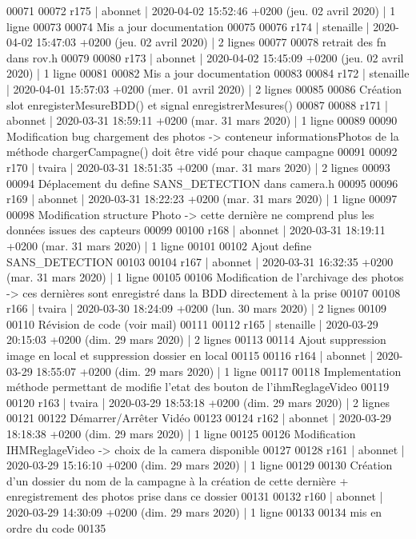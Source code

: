 \begin{DoxyCode}
00071 
00072 r175 | abonnet | 2020-04-02 15:52:46 +0200 (jeu. 02 avril 2020) | 1 ligne
00073 
00074 Mis a jour documentation
00075 
00076 r174 | stenaille | 2020-04-02 15:47:03 +0200 (jeu. 02 avril 2020) | 2 lignes
00077 
00078 retrait des fn dans rov.h
00079 
00080 r173 | abonnet | 2020-04-02 15:45:09 +0200 (jeu. 02 avril 2020) | 1 ligne
00081 
00082 Mis a jour documentation
00083 
00084 r172 | stenaille | 2020-04-01 15:57:03 +0200 (mer. 01 avril 2020) | 2 lignes
00085 
00086 Création slot enregisterMesureBDD() et signal enregistrerMesures()
00087 
00088 r171 | abonnet | 2020-03-31 18:59:11 +0200 (mar. 31 mars 2020) | 1 ligne
00089 
00090 Modification bug chargement des photos -> conteneur informationsPhotos de la méthode chargerCampagne()
       doit être vidé pour chaque campagne
00091 
00092 r170 | tvaira | 2020-03-31 18:51:35 +0200 (mar. 31 mars 2020) | 2 lignes
00093 
00094 Déplacement du define SANS\_DETECTION dans camera.h
00095 
00096 r169 | abonnet | 2020-03-31 18:22:23 +0200 (mar. 31 mars 2020) | 1 ligne
00097 
00098 Modification structure Photo -> cette dernière ne comprend plus les données issues des capteurs
00099 
00100 r168 | abonnet | 2020-03-31 18:19:11 +0200 (mar. 31 mars 2020) | 1 ligne
00101 
00102 Ajout define SANS\_DETECTION
00103 
00104 r167 | abonnet | 2020-03-31 16:32:35 +0200 (mar. 31 mars 2020) | 1 ligne
00105 
00106 Modification de l'archivage des photos -> ces dernières sont enregistré dans la BDD directement à la
       prise
00107 
00108 r166 | tvaira | 2020-03-30 18:24:09 +0200 (lun. 30 mars 2020) | 2 lignes
00109 
00110 Révision de code (voir mail)
00111 
00112 r165 | stenaille | 2020-03-29 20:15:03 +0200 (dim. 29 mars 2020) | 2 lignes
00113 
00114 Ajout suppression image en local et suppression dossier en local
00115 
00116 r164 | abonnet | 2020-03-29 18:55:07 +0200 (dim. 29 mars 2020) | 1 ligne
00117 
00118 Implementation méthode permettant de modifie l'etat des bouton de l'ihmReglageVideo
00119 
00120 r163 | tvaira | 2020-03-29 18:53:18 +0200 (dim. 29 mars 2020) | 2 lignes
00121 
00122 Démarrer/Arrêter Vidéo
00123 
00124 r162 | abonnet | 2020-03-29 18:18:38 +0200 (dim. 29 mars 2020) | 1 ligne
00125 
00126 Modification IHMReglageVideo -> choix de la camera disponible
00127 
00128 r161 | abonnet | 2020-03-29 15:16:10 +0200 (dim. 29 mars 2020) | 1 ligne
00129 
00130 Création d'un dossier du nom de la campagne à la création de cette dernière + enregistrement des
       photos prise dans ce dossier
00131 
00132 r160 | abonnet | 2020-03-29 14:30:09 +0200 (dim. 29 mars 2020) | 1 ligne
00133 
00134 mis en ordre du code
00135 

\end{DoxyCode}
